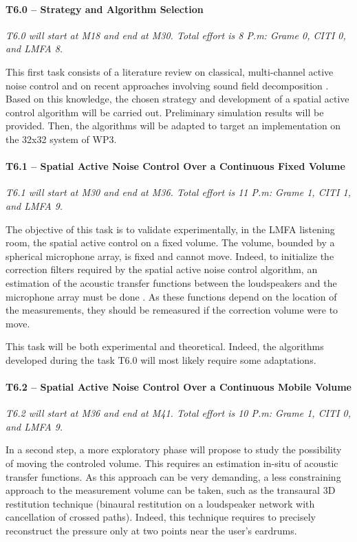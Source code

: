 \documentclass[a4paper,9pt]{extarticle}
\begin{document}
\paragraph{T6.0 -- Strategy and Algorithm Selection} 

\textit{T6.0 will start at M18 and end at M30. Total effort is 8 P.m: Grame 0, CITI 0, and LMFA 8.}

This first task consists of a literature review on classical, multi-channel active noise control \cite{elliott2000signal} and on recent approaches involving sound field decomposition \cite{lecomte2018cancellation,zhang2018active}. Based on this knowledge, the chosen strategy and development of a spatial active control algorithm will be carried out. Preliminary simulation results will be provided. Then, the algorithms will be adapted to target an implementation on the 32x32 system of WP3.

\paragraph{T6.1 -- Spatial Active Noise Control Over a Continuous Fixed Volume}


\textit{T6.1 will start at M30 and end at M36. Total effort is 11 P.m: Grame 1, CITI 1, and LMFA 9.}

The objective of this task is to validate experimentally, in the LMFA listening room, the spatial active control on a fixed volume.
The volume, bounded by a spherical microphone array, is fixed and cannot move. Indeed, to initialize the correction filters required by the spatial active noise control algorithm, an estimation of the acoustic transfer functions between the loudspeakers and the microphone array must be done \cite{lecomte2018cancellation}. As these functions depend on the location of the measurements, they should be remeasured if the correction volume were to move.

This task will be both experimental and theoretical. Indeed, the algorithms developed during the task T6.0 will most likely require some adaptations.

\paragraph{T6.2 -- Spatial Active Noise Control Over a Continuous Mobile Volume}

\textit{T6.2 will start at M36 and end at M41. Total effort is 10 P.m: Grame 1, CITI 0, and LMFA 9.}

In a second step, a more exploratory phase will propose to study the possibility of moving the controled volume. This requires an estimation in-situ of acoustic transfer functions. As this approach can be very demanding, a less constraining approach to the measurement volume can be taken, such as the transaural 3D restitution technique \cite{bharitkar2007immersive} (binaural restitution on a loudspeaker network with cancellation of crossed paths). Indeed, this technique requires to precisely reconstruct the pressure only at two points near the user's eardrums.
\end{document}
